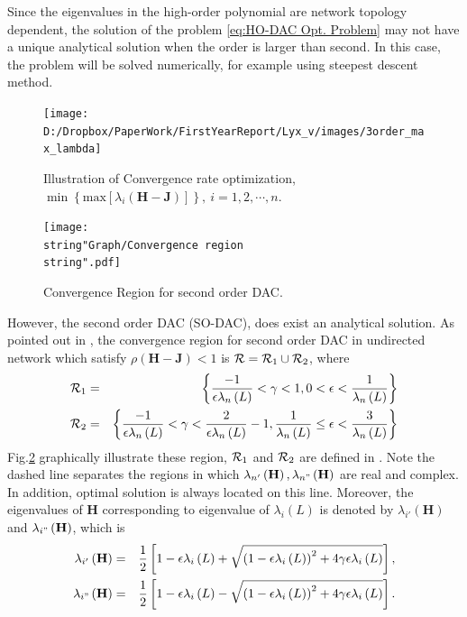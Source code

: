 Since the eigenvalues in the high-order polynomial 
are network topology dependent, the solution of the problem \ref{eq:HO-DAC Opt. Problem}
may not have a unique analytical solution when the order is larger
than second. In this case, the problem will be solved numerically,
for example using steepest descent method. 

\begin{figure}
\hfill{}\texttt{[image: D:/Dropbox/PaperWork/FirstYearReport/Lyx\_v/images/3order\_max\_lambda]}\hfill{}\hfill{}\caption{\label{fig:Find-minimum-rho(H)} Illustration of Convergence rate
optimization, $\min\left\{ \mbox{max}\left[\lambda_{i}\left(\mathbf{H-J}\right)\right]\right\} ,\: i=1,2,\cdots,n$. }
\end{figure}


\begin{figure}
\hfill{}\texttt{[image: \\string"Graph/Convergence region\\string".pdf]}\hfill{}\hfill{}\caption{\label{fig:Convergence-Region}Convergence Region for second order
DAC. }
\end{figure}


However, the second order DAC (SO-DAC), does exist an analytical solution.
As pointed out in \cite{Xiong2009a}, the convergence region for second
order DAC in undirected network which satisfy $\rho\left(\mathbf{H}-\mathbf{J}\right)<1$
is ${\cal R}={\cal R}_{1}\cup{\cal R}_{2}$, where 
\begin{eqnarray}
{\cal R}_{1} & = & \left\{ \frac{-1}{\epsilon\lambda_{n}\left(L\right)}<\gamma<1,0<\epsilon<\frac{1}{\lambda_{n}\left(L\right)}\right\} \\
{\cal R}_{2} & = & \left\{ \frac{-1}{\epsilon\lambda_{n}\left(L\right)}<\gamma<\frac{2}{\epsilon\lambda_{n}\left(L\right)}-1,\frac{1}{\lambda_{n}\left(L\right)}\leq\epsilon<\frac{3}{\lambda_{n}\left(L\right)}\right\} \label{eq:Def Convergence region R1 R2}
\end{eqnarray}
Fig.\ref{fig:Convergence-Region} graphically illustrate these region,
${\cal R}_{1}$ and ${\cal R}_{2}$ are defined in .
Note the dashed line separates the regions in which $\lambda_{n'}\left(\mathbf{H}\right),\lambda_{n"}\left(\mathbf{H}\right)$
are real and complex. In addition, optimal solution is always located
on this line. Moreover, the eigenvalues of $\mathbf{H}$ corresponding
to eigenvalue of $\lambda_{i}\left(L\right)$ is denoted by $\lambda_{i'}\left(\mathbf{H}\right)$
and $\lambda_{i"}\left(\mathbf{H}\right)$, which is 
\begin{eqnarray}
\lambda_{i'}\left(\mathbf{H}\right) & = & \frac{1}{2}\left[1-\epsilon\lambda_{i}\left(L\right)+\sqrt{\left(1-\epsilon\lambda_{i}\left(L\right)\right)^{2}+4\gamma\epsilon\lambda_{i}\left(L\right)}\right],\nonumber \\
\lambda_{i"}\left(\mathbf{H}\right) & = & \frac{1}{2}\left[1-\epsilon\lambda_{i}\left(L\right)-\sqrt{\left(1-\epsilon\lambda_{i}\left(L\right)\right)^{2}+4\gamma\epsilon\lambda_{i}\left(L\right)}\right].\label{eq:2nd-DAC lambda_H solution}
\end{eqnarray}
 

